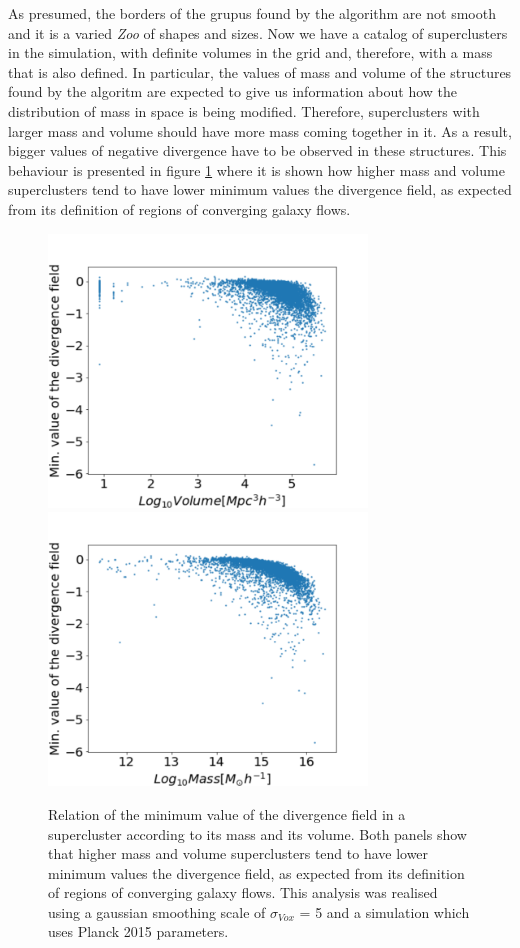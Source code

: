 \documentclass[usenatbib]{mnras}
\begin{document}
As presumed, the borders of the grupus found by the algorithm are not smooth and it is a varied \emph{Zoo} of shapes and sizes. Now we have a catalog of superclusters in the simulation, with definite volumes in the grid and, therefore, with a mass that is also defined. In particular, the values of mass and volume of the structures found by the algoritm are expected to give us information about how the distribution of mass in space is being modified. Therefore, superclusters with larger mass and volume should have more mass coming together in it. As a result, bigger values of negative divergence have to be observed in these structures. This behaviour is presented in figure \ref{fig:min_div} where it is shown how higher mass and volume superclusters tend to have lower minimum values the divergence field, as expected from its definition of regions of converging galaxy flows. 


\begin{figure}
    \centering
    \includegraphics[width=240pt]{min_div_volume.pdf}
    \includegraphics[width=240pt]{min_div_mass.pdf}
    \caption{Relation of the minimum value of the divergence field in a supercluster according to its mass and its volume. Both panels show that higher mass and volume superclusters tend to have lower minimum values the divergence field, as expected from its definition of regions of converging galaxy flows. This analysis was realised using a gaussian smoothing scale of $\sigma_{Vox}$ = 5 and a simulation which uses Planck 2015 parameters.}
    \label{fig:min_div}
\end{figure}
\end{document}
